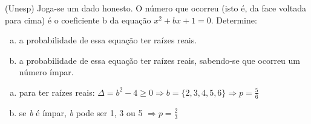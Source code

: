 \begin{ex}
 (Unesp) Joga-se um dado honesto. O número que ocorreu (isto é, da face voltada para cima) é o coeficiente b da equação $x^2 +bx +1 = 0$. Determine:
   \begin{enumerate} [(a)]
       \item a probabilidade de essa equação ter raízes reais.
       \item a probabilidade de essa equação ter raízes reais, sabendo-se que ocorreu um número ímpar. 
   \end{enumerate}
     \begin{sol}
     \phantom{A}
       \begin{enumerate} [(a)]
           \item para ter raízes reais: $\Delta = b^2-4 \geq 0 \Rightarrow b=\{2, 3, 4, 5, 6\}
           \Longrightarrow p=\frac{5}{6}$
           \item se \textit{b} é ímpar, \textit{b} pode ser 1, 3 ou 5 $\Longrightarrow p=\frac{2}{3}$
       \end{enumerate}
     \end{sol}
\end{ex}